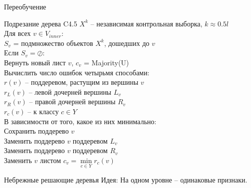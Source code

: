 \documentclass[10pt]{beamer}
\begin{document}
\begin{frame}{Переобучение}
\end{frame}

\begin{frame}{Подрезание дерева C4.5}
  $X^k$ -- независимая контрольная выборка, $k \approx 0.5l$\\
	Для всех $v \in V_{inner}$:\\
		\hspace{10mm} $S_v$ = подмножество объектов $X^k$, дошедших до $v$\\
		\hspace{10mm} Если $S_v = \oslash$:\\
		  \hspace{20mm} Вернуть новый лист $v$, $c_v$ = Majority(U)\\
		\hspace{10mm} Вычислить число ошибок четырьмя способами:\\
			\hspace{20mm} $r(v)$ -- поддеревом, растущим из вершины $v$\\
			\hspace{20mm} $r_L(v)$ -- левой дочерней вершины $L_v$\\
			\hspace{20mm} $r_R(v)$ -- правой дочерней вершины $R_v$\\
			\hspace{20mm} $r_c(v)$ -- к классу $c \in Y$\\
		\hspace{10mm} В зависимости от того, какое из них минимально:\\
			\hspace{20mm} Сохранить поддерево $v$\\
			\hspace{20mm} Заменить поддерево $v$ поддеревом $L_v$\\
			\hspace{20mm} Заменить поддерево $v$ поддеревом $R_v$\\
			\hspace{20mm} Заменить $v$ листом $c_v = \min\limits_{c \in Y} r_c(v)$\\
\end{frame}

{
\begin{frame}{Небрежные решающие деревья}
  \alert{Идея}: На одном уровне – одинаковые признаки.
\end{frame}
}
\end{document}
